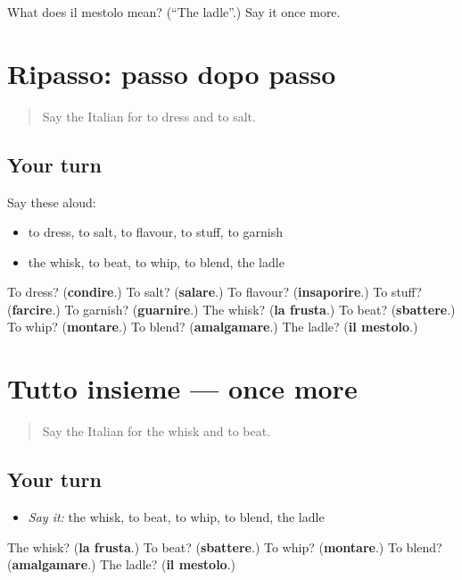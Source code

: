 \begin{tcolorbox}[breakable,colback=teal!4,colframe=teal!35!black,title={Before you move on}]
What does il mestolo mean? (\textquotedblleft{}The ladle\textquotedblright{}.) Say it once more.
\end{tcolorbox}
\section[(dialogue)]{Ripasso: passo dopo passo}

\label{lesson:IT-R338-ripasso-337-338}



\begin{quote}
Say the Italian for to dress and to salt.
\end{quote}

\subsection*{Your turn}
Say these aloud:

\begin{itemize}
\raggedright
  \item to dress, to salt, to flavour, to stuff, to garnish
  \item the whisk, to beat, to whip, to blend, the ladle
\end{itemize}

\begin{tcolorbox}[breakable,colback=teal!4,colframe=teal!35!black,title={Before you move on}]
To dress? (\textbf{condire}.) To salt? (\textbf{salare}.) To flavour? (\textbf{insaporire}.) To stuff? (\textbf{farcire}.) To garnish? (\textbf{guarnire}.) The whisk? (\textbf{la frusta}.) To beat? (\textbf{sbattere}.) To whip? (\textbf{montare}.) To blend? (\textbf{amalgamare}.) The ladle? (\textbf{il mestolo}.)
\end{tcolorbox}
\section[(dialogue)]{Tutto insieme — once more}

\label{lesson:IT-R338-ripasso-final-338}



\begin{quote}
Say the Italian for the whisk and to beat.
\end{quote}

\subsection*{Your turn}
\begin{itemize}
\raggedright
  \item \emph{Say it:} the whisk, to beat, to whip, to blend, the ladle
\end{itemize}

\begin{tcolorbox}[breakable,colback=teal!4,colframe=teal!35!black,title={Before you move on}]
The whisk? (\textbf{la frusta}.) To beat? (\textbf{sbattere}.) To whip? (\textbf{montare}.) To blend? (\textbf{amalgamare}.) The ladle? (\textbf{il mestolo}.)
\end{tcolorbox}
